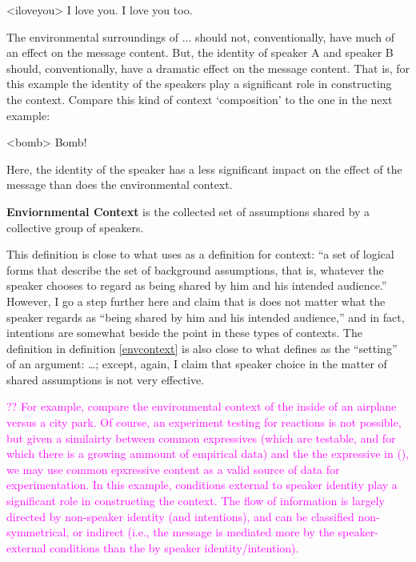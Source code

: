 \documentclass{article}
\begin{document}
\pex<iloveyou>
\a I love you.
\a I love you too.
\xe

The environmental surroundings of ... should not,
conventionally, have much of an effect on the message content. But, the identity of speaker A and
speaker B should, conventionally, have a dramatic effect on the message content. That is, for this
example the identity of the speakers play a significant role in constructing the context. Compare
this kind of context `composition' to the one in the next example:


\ex<bomb> Bomb!
\xe
 
Here, the identity of the speaker has a less significant impact on the effect of the message than does the environmental context. 
\begin{definition}\label{envcontext}
    {\bf Enviornmental Context} is the collected set of assumptions shared by a collective group of speakers.
\end{definition}
This definition is close to what  uses as a definition for context: ``a set of logical forms that describe the set of background assumptions, that is, whatever the speaker chooses to regard as being shared by him and his intended audience.'' However, I go a step further here and claim that is does not matter what the speaker regards as ``being shared by him and his intended audience,'' and in fact, intentions are somewhat beside the point in these types of contexts. The definition in definition \ref{envcontext} is also close to what \cite{parsons96argument} defines as the ``setting'' of an argument: \ldots; except, again, I claim that speaker choice in the matter of shared assumptions is not very effective. 

\textcolor{magenta}{ ?? For example, compare the environmental context of the inside of an airplane versus a city park. Of course, an experiment testing for reactions is not possible, but given a similairty between common expressives (which are testable, and for which there is a growing ammount of empirical data) and the the expressive in (), we may use common epxressive content as a valid source of data for experimentation. In this example, conditions external to speaker identity play a significant role in constructing the context. The flow of information is largely directed by non-speaker identity (and intentions), and can be classified non-symmetrical, or indirect (i.e., the message is mediated more by the speaker-external conditions than the by speaker identity/intention).}
\end{document}
